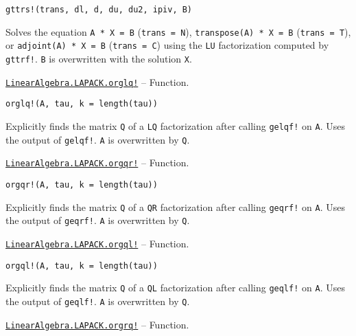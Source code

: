 \begin{adjustwidth}{2em}{0pt}


\begin{verbatim}
gttrs!(trans, dl, d, du, du2, ipiv, B)
\end{verbatim}

Solves the equation \texttt{A * X = B} (\texttt{trans = N}), \texttt{transpose(A) * X = B} (\texttt{trans = T}), or \texttt{adjoint(A) * X = B} (\texttt{trans = C}) using the \texttt{LU} factorization computed by \texttt{gttrf!}. \texttt{B} is overwritten with the solution \texttt{X}.



\end{adjustwidth}
\hypertarget{1878598872812530666}{} 
\hyperlink{1878598872812530666}{\texttt{LinearAlgebra.LAPACK.orglq!}}  -- {Function.}

\begin{adjustwidth}{2em}{0pt}


\begin{verbatim}
orglq!(A, tau, k = length(tau))
\end{verbatim}

Explicitly finds the matrix \texttt{Q} of a \texttt{LQ} factorization after calling \texttt{gelqf!} on \texttt{A}. Uses the output of \texttt{gelqf!}. \texttt{A} is overwritten by \texttt{Q}.



\end{adjustwidth}
\hypertarget{17543646888056798280}{} 
\hyperlink{17543646888056798280}{\texttt{LinearAlgebra.LAPACK.orgqr!}}  -- {Function.}

\begin{adjustwidth}{2em}{0pt}


\begin{verbatim}
orgqr!(A, tau, k = length(tau))
\end{verbatim}

Explicitly finds the matrix \texttt{Q} of a \texttt{QR} factorization after calling \texttt{geqrf!} on \texttt{A}. Uses the output of \texttt{geqrf!}. \texttt{A} is overwritten by \texttt{Q}.



\end{adjustwidth}
\hypertarget{15842803237247761842}{} 
\hyperlink{15842803237247761842}{\texttt{LinearAlgebra.LAPACK.orgql!}}  -- {Function.}

\begin{adjustwidth}{2em}{0pt}


\begin{verbatim}
orgql!(A, tau, k = length(tau))
\end{verbatim}

Explicitly finds the matrix \texttt{Q} of a \texttt{QL} factorization after calling \texttt{geqlf!} on \texttt{A}. Uses the output of \texttt{geqlf!}. \texttt{A} is overwritten by \texttt{Q}.



\end{adjustwidth}
\hypertarget{9300570426687705008}{} 
\hyperlink{9300570426687705008}{\texttt{LinearAlgebra.LAPACK.orgrq!}}  -- {Function.}

